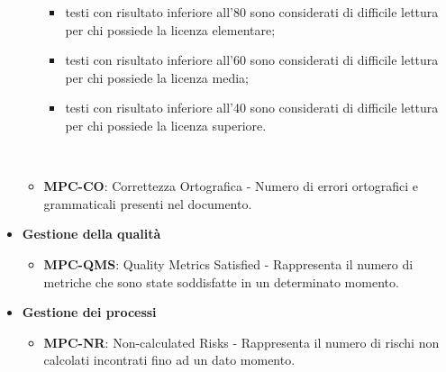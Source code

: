 \begin{itemize}
\begin{itemize}
                \begin{itemize}
                    \item testi con risultato inferiore all'80 sono considerati di difficile lettura per chi possiede la licenza elementare;
                    \item testi con risultato inferiore all'60 sono considerati di difficile lettura per chi possiede la licenza media;
                    \item testi con risultato inferiore all'40 sono considerati di difficile lettura per chi possiede la licenza superiore.
                \end{itemize}\\
            \item \textbf{MPC-CO}: Correttezza Ortografica - Numero di errori ortografici e grammaticali presenti nel documento.\\
        \end{itemize}
    \item \textbf{Gestione della qualità}
        \begin{itemize}
            \item \textbf{MPC-QMS}: Quality Metrics Satisfied - Rappresenta il numero di metriche che sono state soddisfatte in un determinato momento.\\
        \end{itemize}
    \item \textbf{Gestione dei processi}
        \begin{itemize}
            \item \textbf{MPC-NR}: Non-calculated Risks - Rappresenta il numero di rischi non calcolati incontrati fino ad un dato momento.\\
        \end{itemize}
\end{itemize}

